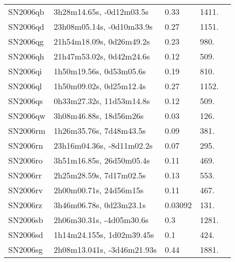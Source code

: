 \begin{longtable}{lllll}
         SN2006qb &       3h28m14.65s, -0d12m03.5s &     0.33 &          1411. &    \citet{2006IAUC.8782A...1M} \\
         SN2006qd &      23h08m05.14s, -0d10m33.9s &     0.27 &          1151. &    \citet{2006IAUC.8782A...1M} \\
         SN2006qg &       21h54m18.09s, 0d26m49.2s &     0.23 &           980. &    \citet{2006IAUC.8782A...1M} \\
         SN2006qh &       21h47m53.02s, 0d42m24.6s &     0.12 &           509. &    \citet{2006IAUC.8782A...1M} \\
         SN2006qi &        1h50m19.56s, 0d53m05.6s &     0.19 &           810. &    \citet{2006IAUC.8782A...1M} \\
         SN2006ql &        1h50m09.02s, 0d25m12.4s &     0.27 &          1152. &    \citet{2006IAUC.8782A...1M} \\
         SN2006qs &       0h33m27.32s, 11d53m14.8s &     0.12 &           509. &    \citet{2006IAUC.8784A...1G} \\
         SN2006qw &         3h08m46.88s, 18d56m26s &     0.03 &           126. &    \citet{2006IAUC.8784A...1G} \\
         SN2006rm &        1h26m35.76s, 7d48m43.5s &     0.09 &           381. &    \citet{2006IAUC.8784A...1G} \\
         SN2006rn &      23h16m04.36s, -8d11m02.2s &     0.07 &           295. &    \citet{2006IAUC.8784A...1G} \\
         SN2006ro &       3h51m16.85s, 26d50m05.4s &     0.11 &           469. &    \citet{2006IAUC.8784A...1G} \\
         SN2006rr &        2h25m28.59s, 7d17m02.5s &     0.13 &           553. &    \citet{2006IAUC.8784A...1G} \\
         SN2006rv &         2h00m00.71s, 24d56m15s &     0.11 &           467. &  \citet{2012AandA...544A..81H} \\
         SN2006rz &        3h46m06.78s, 0d23m23.1s &  0.03092 &           131. &    \citet{2005SDSS4.C...0000:} \\
         SN2006sb &       2h06m30.31s, -4d05m30.6s &      0.3 &          1281. &    \citet{2006IAUC.8784A...1G} \\
         SN2006sd &      1h14m24.155s, 1d02m39.45s &      0.1 &           424. &    \citet{2006IAUC.8784A...1G} \\
         SN2006sg &     2h08m13.041s, -3d46m21.93s &     0.44 &          1881. &    \citet{2006IAUC.8784A...1G} \\

\end{longtable}
